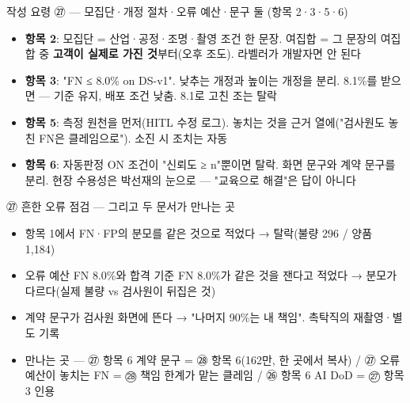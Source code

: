 \begin{frame}{작성 요령 ㉗ — 모집단·개정 절차·오류 예산·문구 둘 (항목 2·3·5·6)}
\begin{itemize}
\item \textbf{항목 2}: 모집단 = 산업·공정·조명·촬영 조건 한 문장. 여집합 = 그 문장의 여집합 중 \textbf{고객이 실제로 가진 것}부터(오후 조도). 라벨러가 개발자면 안 된다
\item \textbf{항목 3}: "FN ≤ 8.0\% on DS-v1". 낮추는 개정과 높이는 개정을 분리. 8.1\%를 받으면 — 기준 유지, 배포 조건 낮춤. 8.1로 고친 조는 탈락
\item \textbf{항목 5}: 측정 원천을 먼저(HITL 수정 로그). 놓치는 것을 근거 열에("검사원도 놓친 FN은 클레임으로"). 소진 시 조치는 자동
\item \textbf{항목 6}: 자동판정 ON 조건이 "신뢰도 ≥ n"뿐이면 탈락. 화면 문구와 계약 문구를 분리. 현장 수용성은 박선재의 눈으로 — "교육으로 해결"은 답이 아니다
\end{itemize}
\end{frame}

\begin{frame}{㉗ 흔한 오류 점검 — 그리고 두 문서가 만나는 곳}
\begin{itemize}
\item 항목 1에서 FN·FP의 분모를 같은 것으로 적었다 → 탈락(불량 296 / 양품 1,184)
\item 오류 예산 FN 8.0\%와 합격 기준 FN 8.0\%가 같은 것을 잰다고 적었다 → 분모가 다르다(실제 불량 vs 검사원이 뒤집은 것)
\item 계약 문구가 검사원 화면에 뜬다 → "나머지 90\%는 내 책임". 촉탁직의 재촬영·별도 기록
\item 만나는 곳 — ㉗ 항목 6 계약 문구 = ㉘ 항목 6(162만, 한 곳에서 복사) / ㉗ 오류 예산이 놓치는 FN = ㉘ 책임 한계가 맡는 클레임 / ㉖ 항목 6 AI DoD = ㉗ 항목 3 인용
\end{itemize}
\end{frame}

